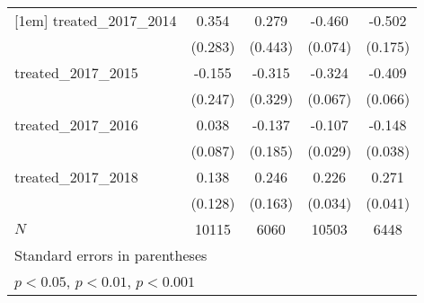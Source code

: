 {\begin{tabular}{l*{4}{c}}
[1em]
treated\_2017\_2014&       0.354         &       0.279         &      -0.460\sym{***}&      -0.502\sym{**} \\
            &     (0.283)         &     (0.443)         &     (0.074)         &     (0.175)         \\
[1em]
treated\_2017\_2015&      -0.155         &      -0.315         &      -0.324\sym{***}&      -0.409\sym{***}\\
            &     (0.247)         &     (0.329)         &     (0.067)         &     (0.066)         \\
[1em]
treated\_2017\_2016&       0.038         &      -0.137         &      -0.107\sym{***}&      -0.148\sym{***}\\
            &     (0.087)         &     (0.185)         &     (0.029)         &     (0.038)         \\
[1em]
treated\_2017\_2018&       0.138         &       0.246         &       0.226\sym{***}&       0.271\sym{***}\\
            &     (0.128)         &     (0.163)         &     (0.034)         &     (0.041)         \\
\hline
\(N\)       &       10115         &        6060         &       10503         &        6448         \\
\hline\hline
\multicolumn{5}{l}{\footnotesize Standard errors in parentheses}\\
\multicolumn{5}{l}{\footnotesize \sym{*} \(p<0.05\), \sym{**} \(p<0.01\), \sym{***} \(p<0.001\)}\\
\end{tabular}
}
